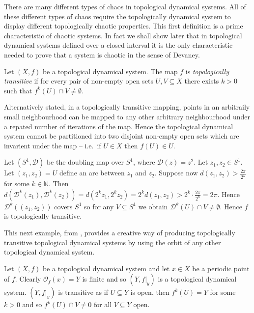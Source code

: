There are many different types of chaos in topological dynamical systems. All of these different types of chaos require the topologically dynamical system to display different topologically chaotic properties.
This first definition is a prime characteristic of chaotic systems. In fact we shall show later that in topological dynamical systems defined over a closed interval it is the only characteristic needed to prove that a system is chaotic in the sense of Devaney.

\begin{defn} \label{defn:topological-transitivity}
    Let $(X, f)$ be a topological dynamical system. The map $f$ is \emph{topologically transitive} if for every pair of non-empty open sets $U, V \subseteq X$ there exists $k > 0$ such that $f^k(U) \cap V \neq \emptyset$.
\end{defn}

Alternatively stated, in a topologically transitive mapping, points in an arbitraily small neighbourhood can be mapped to any other arbitrary neighbourhood under a repated number of iterations of the map. Hence the topological dynamical system cannot be partitioned into two disjoint non-empty open sets which are invarient under the map -- i.e.\ if $U \in X$ then $f(U) \in U$.

\begin{exmp}
    Let $(S^1, \mathcal{D})$ be the doubling map over $S^1$, where $\mathcal{D}(z) = z^2$. Let $z_1, z_2 \in S^1$. Let $(z_1, z_2) = U$ define an arc between $z_1$ and $z_2$. Suppose now $d\left(z_1, z_2\right) > \frac{2\pi}{2^k}$ for some $k \in \mathbb{N}$. Then $d\left(\mathcal{D}^k(z_1), \mathcal{D}^k(z_2)\right) = d\left( 2^k z_1, 2^k z_2 \right) = 2^k d\left( z_1, z_2 \right) > 2^k \cdot \frac{2\pi}{2^k} = 2\pi$. Hence $\mathcal{D}^k((z_1, z_2))$ covers $S^1$ so for any $V \subseteq S^1$ we obtain $\mathcal{D}^k(U) \cap V \neq \emptyset$. Hence $f$ is topologically transitive.
\end{exmp}

This next example, from \cite{kolyada-snoha}, provides a creative way of producing topologically transitive topological dynamical systems by using the orbit of any other topological dynamical system.

\begin{exmp}
    Let $(X, f)$ be a topological dynamical system and let $x \in X$ be a periodic point of $f$. Clearly $\mathcal{O}_f(x) = Y$ is finite and so $(Y, f|_y)$ is a topological dynamical system. $(Y, f|_y)$ is transitive as if $U \subseteq Y$ is open, then $f^k(U) = Y$ for some $k > 0$ and so $f^k(U) \cap V \neq 0$ for all $V \subseteq Y$ open.
\end{exmp}

